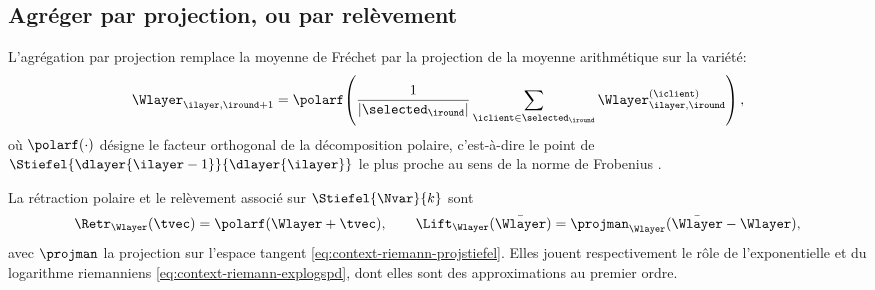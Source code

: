 
\subsection{Agréger par projection, ou par relèvement}
\label{sec:spdnet-federe-agregation}

\begin{definition}
\label{def:spdnet-projavg}
  L'agrégation par projection remplace la moyenne de Fréchet par la projection
  de la moyenne arithmétique sur la variété:
  \begin{equation}
    \Wlayer_{\ilayer,\iround+1}
    =
    \polarf\!\left(\frac{1}{|\selected_\iround|}\sum_{\iclient\in\selected_\iround}\Wlayer_{\ilayer,\iround}^{(\iclient)}\right),
    \label{eq:spdnet-projavg}
  \end{equation}
  où $\polarf(\cdot)$ désigne le facteur orthogonal de la décomposition polaire,
  c'est-à-dire le point de $\Stiefel{\dlayer{\ilayer-1}}{\dlayer{\ilayer}}$ le
  plus proche au sens de la norme de Frobenius
  .
\end{definition}

\begin{definition}
\label{def:spdnet-lift}
  La rétraction polaire et le relèvement associé sur
  $\Stiefel{\Nvar}{k}$ sont
  \begin{equation}
    \Retr_{\Wlayer}(\tvec)
    =
    \polarf(\Wlayer+\tvec),
    \qquad
    \Lift_{\Wlayer}(\bar{\Wlayer})
    =
    \projman_{\Wlayer}(\bar{\Wlayer}-\Wlayer),
    \label{eq:spdnet-lift}
  \end{equation}
  avec $\projman$ la projection sur l'espace tangent
  \cref{eq:context-riemann-projstiefel}. Elles jouent respectivement le rôle de
  l'exponentielle et du logarithme riemanniens
  \cref{eq:context-riemann-explogspd}, dont elles sont des approximations au
  premier ordre.
\end{definition}

